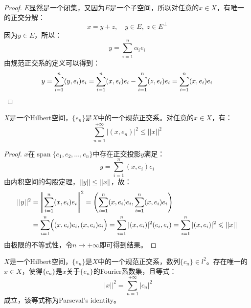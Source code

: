 \begin{proof}
	$E$显然是一个闭集，又因为$E$是一个子空间，所以对任意的$x\in X$，有唯一的正交分解：
	\begin{equation*}
		x=y+z,\quad y\in E,\;z\in E^{\perp}
	\end{equation*}
	因为$y\in E$，所以：
	\begin{equation*}
		y=\sum_{i=1}^{n}\alpha_ie_i
	\end{equation*}
	由规范正交系的定义可以得到：
	\begin{equation*}
		y=\sum_{i=1}^{n}(y,e_i)e_i=\sum_{i=1}^{n}(x,e_i)e_i-\sum_{i=1}^{n}(z,e_i)e_i=\sum_{i=1}^{n}(x,e_i)e_i\qedhere
	\end{equation*}
\end{proof}
\begin{theorem}
	$X$是一个Hilbert空间，$\{e_n\}$是$X$中的一个规范正交系。对任意的$x\in X$，有：
	\begin{equation*}
		\sum_{n=1}^{+\infty}|(x,e_n)|^2\leqslant||x||^2
	\end{equation*}
\end{theorem}
\begin{proof}
	$x$在$\operatorname{span}\{e_1,e_2,\dots,e_n\}$中存在正交投影$y$满足：
	\begin{equation*}
		y=\sum_{i=1}^{n}(x,e_i)e_i
	\end{equation*}
	由内积空间的勾股定理，$||y||\leqslant||x||$，故：
	\begin{align*}
		||y||^2
		&=\left\|\sum_{i=1}^{n}(x,e_i)e_i\right\|^2 =\left(\sum_{i=1}^{n}(x,e_i)e_i,\sum_{i=1}^{n}(x,e_i)e_i\right) \\
		&=\sum_{i=1}^n\Bigl((x,e_i)e_i,(x,e_i)e_i\Bigr) =\sum_{i=1}^n|(x,e_i)|^2(e_i,e_i) =\sum_{i=1}^n|(x,e_i)|^2\leqslant||x||
	\end{align*}
	由极限的不等式性，令$n\to+\infty$即可得到结果。
\end{proof}
\begin{theorem}\label{theo:Parseval's identity}
	$X$是一个Hilbert空间，$\{e_n\}$是$X$中的一个规范正交系，数列$\{c_n\}\in l^2$。存在唯一的$x\in X$，使得$\{c_n\}$是$x$关于$\{e_n\}$的Fourier系数集，且等式：
	\begin{equation*}
		||x||^2=\sum_{n=1}^{+\infty}|c_n|^2
	\end{equation*}
	成立，该等式称为Parseval's identity。
\end{theorem}
